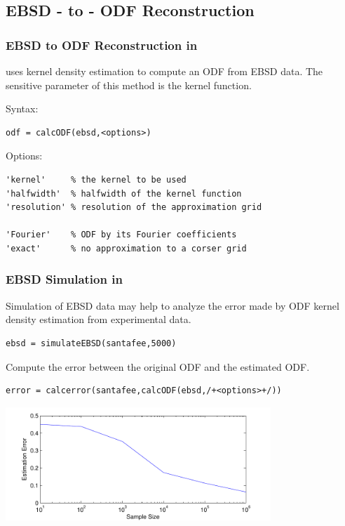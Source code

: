 \subsection*{EBSD - to - ODF Reconstruction}


\begin{frame}[fragile]
  \frametitle{EBSD to ODF Reconstruction in \MTEX}

  \mtex uses kernel density estimation to compute an ODF from EBSD data. The
  sensitive parameter of this method is the kernel function.

\medskip

  Syntax:
  \begin{alertenv}
\begin{lstlisting}
odf = calcODF(ebsd,<options>)
\end{lstlisting}
  \end{alertenv}

Options:
\begin{lstlisting}
'kernel'     % the kernel to be used
'halfwidth'  % halfwidth of the kernel function
'resolution' % resolution of the approximation grid

'Fourier'    % ODF by its Fourier coefficients
'exact'      % no approximation to a corser grid
\end{lstlisting}


\end{frame}


\begin{frame}[fragile]
  \frametitle{EBSD Simulation in \mtex}

  Simulation of EBSD data may help to analyze the error made by ODF kernel
  density estimation from experimental data.

\begin{lstlisting}
ebsd = simulateEBSD(santafee,5000)
\end{lstlisting}

Compute the error between the original ODF and the estimated ODF.
\begin{lstlisting}
error = calcerror(santafee,calcODF(ebsd,/+<options>+/))
\end{lstlisting}

      \centerline{
      \includegraphics[width=10cm]{pic/ebsdcorrectness}}

\end{frame}






